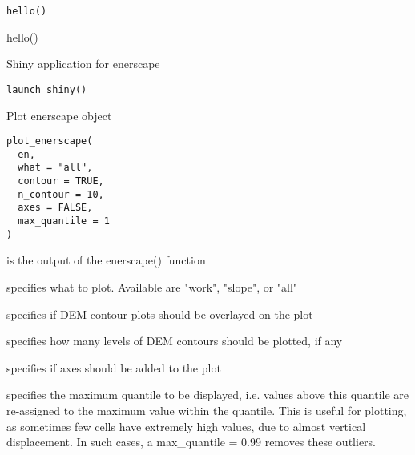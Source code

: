\documentclass[letterpaper]{book}
\begin{document}
%
\begin{Usage}
\begin{verbatim}
hello()
\end{verbatim}
\end{Usage}
%
\begin{Examples}
\begin{ExampleCode}
hello()
\end{ExampleCode}
\end{Examples}
%
\begin{Description}\relax
Shiny application for enerscape
\end{Description}
%
\begin{Usage}
\begin{verbatim}
launch_shiny()
\end{verbatim}
\end{Usage}
%
\begin{Description}\relax
Plot enerscape object
\end{Description}
%
\begin{Usage}
\begin{verbatim}
plot_enerscape(
  en,
  what = "all",
  contour = TRUE,
  n_contour = 10,
  axes = FALSE,
  max_quantile = 1
)
\end{verbatim}
\end{Usage}
%
\begin{Arguments}
\begin{ldescription}
\item[\code{en}] is the output of the enerscape() function

\item[\code{what}] specifies what to plot. Available are "work", "slope", or "all"

\item[\code{contour}] specifies if DEM contour plots should be overlayed on the plot

\item[\code{n\_contour}] specifies how many levels of DEM contours should be plotted,
if any

\item[\code{axes}] specifies if axes should be added to the plot

\item[\code{max\_quantile}] specifies the maximum quantile to be displayed, i.e.
values above this quantile are re-assigned to the maximum value within the
quantile. This is useful for plotting, as sometimes few cells have
extremely high values, due to almost vertical displacement. In such cases,
a max\_quantile = 0.99 removes these outliers.
\end{ldescription}
\end{Arguments}
\printindex{}
\end{document}
